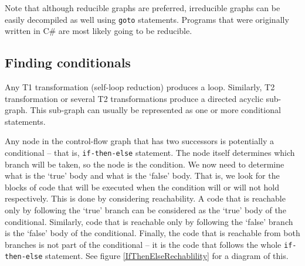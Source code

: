 \documentclass[12pt,twoside,notitlepage]{report}
\begin{document}
Note that although reducible graphs are preferred,
irreducible graphs can be easily decompiled as well
using \verb|goto| statements.  Programs that were originally
written in C\# are most likely going to be reducible.

\subsection{Finding conditionals}

Any T1 transformation (self-loop reduction) produces a loop.
Similarly, T2 transformation or several T2 transformations
produce a directed acyclic sub-graph.  This sub-graph can
usually be represented as one or more conditional statements.

Any node in the control-flow graph that has two successors
is potentially a conditional -- that is, \verb|if-then-else|
statement.  The node itself determines which branch will
be taken, so the node is the condition.  We now need to
determine what is the `true' body and what is the `false'
body.  That is, we look for the blocks of code that will
be executed when the condition will or will not hold respectively.
This is done by considering reachability.  A code that is 
reachable only by following the `true' branch can be 
considered as the `true' body of the conditional.  
Similarly, code that is reachable only by following the
`false' branch is the `false' body of the conditional.
Finally, the code that is reachable from both branches is
not part of the conditional -- it is the code that follows
the whole \verb|if-then-else| statement.
See figure \ref{IfThenElseRechablility} for a diagram of this.
\end{document}
